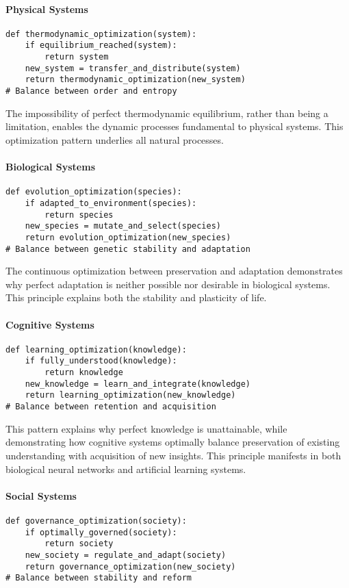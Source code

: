 \documentclass[12pt]{article}
\begin{document}
\paragraph{Physical Systems}
\begin{verbatim}
def thermodynamic_optimization(system):
    if equilibrium_reached(system):
        return system
    new_system = transfer_and_distribute(system)
    return thermodynamic_optimization(new_system)
# Balance between order and entropy
\end{verbatim}

The impossibility of perfect thermodynamic equilibrium, rather than being a limitation, enables the dynamic processes fundamental to physical systems. This optimization pattern underlies all natural processes.

\paragraph{Biological Systems}
\begin{verbatim}
def evolution_optimization(species):
    if adapted_to_environment(species):
        return species
    new_species = mutate_and_select(species)
    return evolution_optimization(new_species)
# Balance between genetic stability and adaptation
\end{verbatim}

The continuous optimization between preservation and adaptation demonstrates why perfect adaptation is neither possible nor desirable in biological systems. This principle explains both the stability and plasticity of life.

\paragraph{Cognitive Systems}
\begin{verbatim}
def learning_optimization(knowledge):
    if fully_understood(knowledge):
        return knowledge
    new_knowledge = learn_and_integrate(knowledge)
    return learning_optimization(new_knowledge)
# Balance between retention and acquisition
\end{verbatim}

This pattern explains why perfect knowledge is unattainable, while demonstrating how cognitive systems optimally balance preservation of existing understanding with acquisition of new insights. This principle manifests in both biological neural networks and artificial learning systems.

\paragraph{Social Systems}
\begin{verbatim}
def governance_optimization(society):
    if optimally_governed(society):
        return society
    new_society = regulate_and_adapt(society)
    return governance_optimization(new_society)
# Balance between stability and reform
\end{verbatim}
\end{document}
